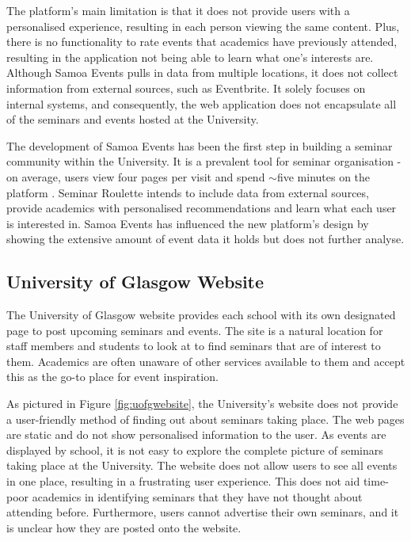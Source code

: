 \documentclass{l4proj}
\begin{document}
The platform's main limitation is that it does not provide users with a personalised experience, resulting in each person viewing the same content. Plus, there is no functionality to rate events that academics have previously attended, resulting in the application not being able to learn what one's interests are. Although Samoa Events pulls in data from multiple locations, it does not collect information from external sources, such as Eventbrite. It solely focuses on internal systems, and consequently, the web application does not encapsulate all of the seminars and events hosted at the University.

The development of Samoa Events has been the first step in building a seminar community within the University. It is a prevalent tool for seminar organisation - on average, users view four pages per visit and spend ${\sim}$five minutes on the platform \citep{samoaalexastats}. Seminar Roulette intends to include data from external sources, provide academics with personalised recommendations and learn what each user is interested in. Samoa Events has influenced the new platform's design by showing the extensive amount of event data it holds but does not further analyse.

\subsection{University of Glasgow Website}
\label{section:uofgwebsite}

The University of Glasgow website \citep{uofg} provides each school with its own designated page to post upcoming seminars and events. The site is a natural location for staff members and students to look at to find seminars that are of interest to them. Academics are often unaware of other services available to them and accept this as the go-to place for event inspiration.

As pictured in Figure \ref{fig:uofgwebsite}, the University's website does not provide a user-friendly method of finding out about seminars taking place. The web pages are static and do not show personalised information to the user. As events are displayed by school, it is not easy to explore the complete picture of seminars taking place at the University. The website does not allow users to see all events in one place, resulting in a frustrating user experience. This does not aid time-poor academics in identifying seminars that they have not thought about attending before. Furthermore, users cannot advertise their own seminars, and it is unclear how they are posted onto the website.
\end{document}
